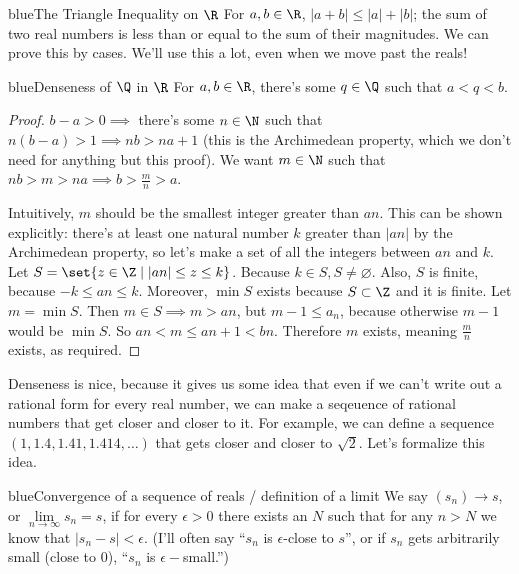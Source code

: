 \documentclass[./analysis.tex]{subfiles}
\begin{document}
    \begin{mycolorbox}{blue}{The Triangle Inequality on $\R$} 
        For $a, b \in \R$, $|a + b| \leq |a| + |b|$; the sum of two real numbers is less than or equal to the sum of their magnitudes. We can prove this by cases. We'll use this a lot, even when we move past the reals!
    \end{mycolorbox}

    \begin{mycolorbox}{blue}{Denseness of $\Q$ in $\R$} For $a, b \in \R$, there's some $q \in \Q$ such that $ a < q < b$. \end{mycolorbox}

    \begin{proof}
        $b - a > 0 \implies$ there's some $n \in \N$ such that $n(b - a) > 1 \implies nb > na + 1$ (this is the Archimedean property, which we don't need for anything but this proof). We want $m \in \N$ such that $nb > m > na \implies b > \frac{m}{n} > a$. 

        Intuitively, $m$ should be the smallest integer greater than $an$. This can be shown explicitly: there's at least one natural number $k$ greater than $|an|$ by the Archimedean property, so let's make a set of all the integers between $an$ and $k$. Let $S = \set{z \in \Z \mid |an| \leq z \leq k}$. Because $k \in S, S \neq \varnothing$. Also, $S$ is finite, because $-k \leq an \leq k$. Moreover, $\min S$ exists because $S \subset \Z$ and it is finite. Let $m = \min S$. Then $m \in S \implies m > an$, but $m - 1 \leq a_n$, because otherwise $m-1$ would be $\min S$. So $an < m \leq an + 1 < bn$. Therefore $m$ exists, meaning $\frac{m}{n}$ exists, as required.
    \end{proof}

    Denseness is nice, because it gives us some idea that even if we can't write out a rational form for every real number, we can make a seqeuence of rational numbers that get closer and closer to it. For example, we can define a sequence $(1, 1.4, 1.41, 1.414, \dots)$ that gets closer and closer to $\sqrt{2}$. Let's formalize this idea.

    \begin{mycolorbox}{blue}{Convergence of a sequence of reals / definition of a limit} We say $(s_n) \to s$, or $\lim\limits_{n \to \infty} s_n = s$, if for every $\epsilon > 0$ there exists an $N$ such that for any $n > N$ we know that $|s_n - s| < \epsilon$. (I'll often say ``$s_n$ is $\epsilon$-close to $s$'', or if $s_n$ gets arbitrarily small (close to 0), ``$s_n$ is $\epsilon-$small.'') \end{mycolorbox}
\end{document}
